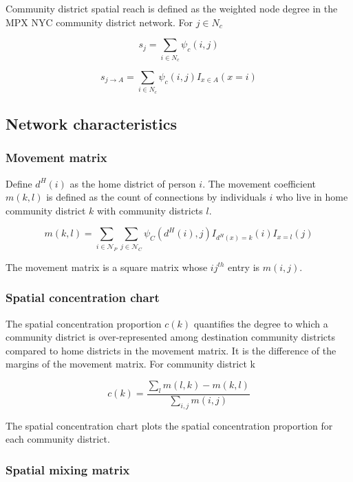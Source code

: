 \documentclass[
  letterpaper,
  DIV=11,
  numbers=noendperiod,
  oneside]{scrreprt}
\begin{document}
Community district spatial reach is defined as the weighted node degree
in the MPX NYC community district network. For \(j \in N_c\)

\[
s_j = \sum_{i \in N_c}{\psi_c (i,j)}
\]

\[
s_{j \rightarrow A} = \sum_{i \in N_c}{\psi_c (i,j)I_{x \in A}(x = i)}
\]

\hypertarget{network-characteristics-1}{%
\subsection{Network characteristics}\label{network-characteristics-1}}

\hypertarget{movement-matrix}{%
\subsubsection{Movement matrix}\label{movement-matrix}}

Define \(d^H(i)\) as the home district of person \(i\). The movement
coefficient \(m(k,l)\) is defined as the count of connections by
individuals \(i\) who live in home community district \(k\) with
community districts \(l\).

\[
m(k,l) = \sum_{i \in \mathscr{N}_P} \sum_{j \in \mathscr{N}_C} \psi_C (d^H(i),j)I_{d^H(x)=k}(i)I_{x=l}(j)
\]

The movement matrix is a square matrix whose \(ij^{th}\) entry is
\(m(i,j)\).

\hypertarget{spatial-concentration-chart}{%
\subsubsection{Spatial concentration
chart}\label{spatial-concentration-chart}}

The spatial concentration proportion \(c(k)\) quantifies the degree to
which a community district is over-represented among destination
community districts compared to home districts in the movement matrix.
It is the difference of the margins of the movement matrix. For
community district k

\[
c(k) = \frac{\sum_l{m(l,k) - m(k,l)}}{\sum_{i,j}{m(i,j)}}
\]

The spatial concentration chart plots the spatial concentration
proportion for each community district.

\hypertarget{spatial-mixing-matrix}{%
\subsubsection{Spatial mixing matrix}\label{spatial-mixing-matrix}}
\end{document}
